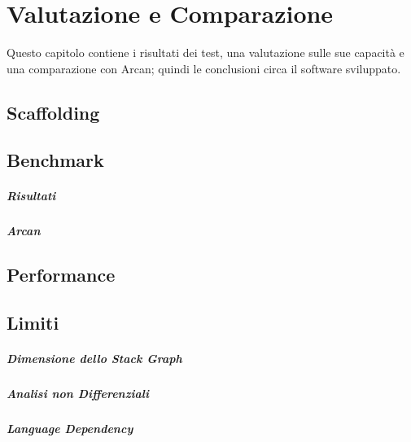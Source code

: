 \chapter{Valutazione e Comparazione}

Questo capitolo contiene i risultati dei test, una valutazione sulle sue capacit\`a e una comparazione con Arcan; quindi le conclusioni circa il software sviluppato.

\section{Scaffolding}

\section{Benchmark}

\paragraph{Risultati}

\paragraph{Arcan}

\section{Performance}

\section{Limiti}

\paragraph{Dimensione dello Stack Graph}

\paragraph{Analisi non Differenziali}

\paragraph{Language Dependency}
